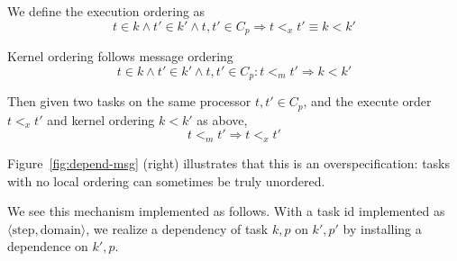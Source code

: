 \begin{definition}
  We define the execution ordering as
  \[ t\in k \wedge t'\in k' \wedge t,t'\in C_p \Rightarrow
  t\mathbin{<_x}t'\equiv k<k'
  \]
\end{definition}
\begin{definition}
  Kernel ordering follows message ordering
  \[ t\in k \wedge t'\in k' \wedge t,t'\in C_p \colon
  t\mathbin{<_m}t'\Rightarrow k<k'
  \]
\end{definition}

\begin{corollary}
  Then
 given two tasks on the same processor $t,t'\in C_p$,
and the execute order $t\mathbin{<_x}t'$ and kernel ordering $k<k'$ as above,
  \[ t\mathbin{<_m}t'\Rightarrow t\mathbin{<_x}t' \]
\end{corollary}

Figure~\ref{fig:depend-msg} (right) illustrates that this is an overspecification:
tasks with no local ordering can sometimes be truly unordered.

We see this mechanism implemented as follows. With a task id implemented
as $\langle\mathrm{step},\mathrm{domain}\rangle$, we realize a dependency
of task $k,p$ on $k',p'$ by installing a dependence on $k',p$.
